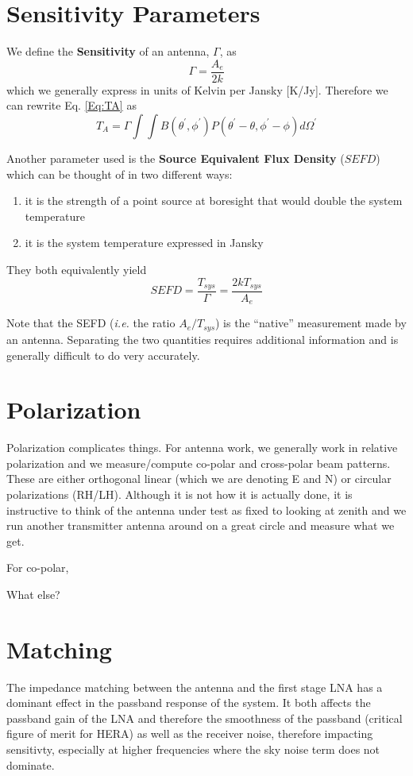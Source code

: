 \documentclass[11pt]{article}
\begin{document}
\section{Sensitivity Parameters}
We define the {\bf Sensitivity} of an antenna, $\Gamma$, as
\begin{equation}
\Gamma = \frac{A_e}{2k}
\end{equation}
which we generally express in units of Kelvin per Jansky [K/Jy].  Therefore we can rewrite Eq. \ref{Eq:TA} as
\begin{equation}
T_A =  \Gamma \int \int B(\theta^\prime,\phi^\prime)P(\theta^\prime-\theta,\phi^\prime-\phi)d\Omega^\prime
\end{equation}

Another parameter used is the {\bf Source Equivalent Flux Density} ($SEFD$) which can be thought of in two different ways:
\begin{enumerate}
	\item it is the strength of a point source at boresight that would double the system temperature
	\item it is the system temperature expressed in Jansky
\end{enumerate}
They both equivalently yield
\begin{equation}
SEFD = \frac{T_{sys}}{\Gamma} = \frac{2kT_{sys}}{A_e}
\end{equation}

Note that the SEFD ({\em i.e.} the ratio $A_e/T_{sys}$) is the ``native'' measurement made by an antenna.  Separating the two quantities requires additional information and is generally difficult to do very accurately. 

\section{Polarization}
Polarization complicates things.  For antenna work, we generally work in relative polarization and we measure/compute co-polar and cross-polar beam patterns.  These are either orthogonal linear (which we are denoting E and N) or circular polarizations (RH/LH).
Although it is not how it is actually done, it is instructive to think of the antenna under test as fixed to looking at zenith and we run another transmitter antenna around on a great circle and measure what we get.

For co-polar, 

What else?

\section{Matching}
The impedance matching between the antenna and the first stage LNA has a dominant effect in the passband response of the system. It both affects the passband gain of the LNA and therefore the smoothness of the passband (critical figure of merit for HERA) as well as the receiver noise, therefore impacting sensitivty, especially at higher frequencies where the sky noise term does not dominate.
\end{document}
